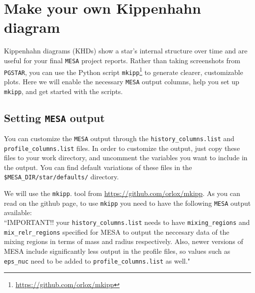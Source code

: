 \documentclass[11pt,a4paper]{article}
\begin{document}





\section{Make your own Kippenhahn diagram}\label{sec:make_kippenhahn}

Kippenhahn diagrams (KHDs) show a star’s internal structure over time and are useful for your final \texttt{MESA} project reports. Rather than taking screenshots from \texttt{PGSTAR}, you can use the Python script \texttt{mkipp}\footnote{\url{https://github.com/orlox/mkipp}} to generate clearer, customizable plots. 
Here we will enable the necessary \texttt{MESA} output columns,  help you set up \texttt{mkipp}, and get started with the scripts.

\subsection{Setting \texttt{MESA} output}

You can customize the \texttt{MESA} output through the \texttt{history\_columns.list} and \texttt{profile\_columns.list} files. In order to customize the output, just copy these files to your work directory, and uncomment the variables you want to include in the output. You can find default variations of these files in the \texttt{\$MESA\_DIR/star/defaults/} directory. 


We will use the \texttt{mkipp}. tool from \url{https://github.com/orlox/mkipp}.
As you can read on the github page, to use \texttt{mkipp} you need to have the following \texttt{MESA} output available:\\
%
``IMPORTANT!! your \texttt{history\_columns.list} needs to have \texttt{mixing\_regions} and \\
 \texttt{mix\_relr\_regions} specified for MESA to output the neccesary data of the mixing regions in terms of mass and radius respectively. Also, newer versions of MESA include significantly less output in the profile files, so values such as \texttt{eps\_nuc} need to be added to \texttt{profile\_columns.list} as well."
\end{document}
